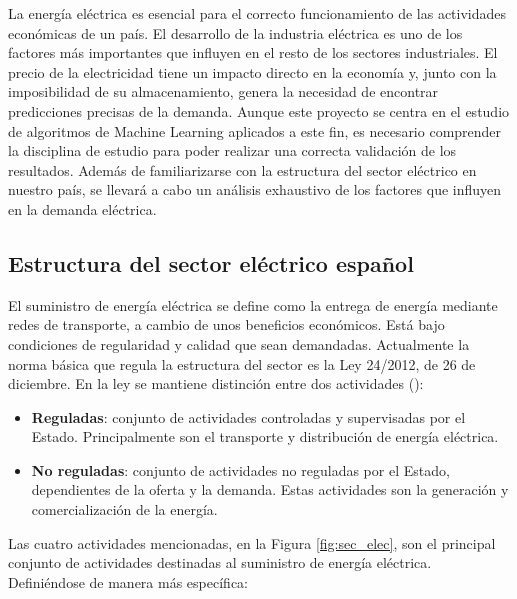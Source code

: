 \documentclass[12pt,a4paper]{report}
\begin{document}
La energía eléctrica es esencial para el correcto funcionamiento de las actividades económicas de un país. El desarrollo de la industria eléctrica es uno de los factores más importantes que influyen en el resto de los sectores industriales. El precio de la electricidad tiene un impacto directo en la economía y, junto con la imposibilidad de su almacenamiento, genera la necesidad de encontrar predicciones precisas de la demanda. Aunque este proyecto se centra en el estudio de algoritmos de Machine Learning aplicados a este fin, es necesario comprender la disciplina de estudio para poder realizar una correcta validación de los resultados. Además de familiarizarse con la estructura del sector eléctrico en nuestro país, se llevará a cabo un análisis exhaustivo de los factores que influyen en la demanda eléctrica.

\subsection{Estructura del sector eléctrico español}

El suministro de energía eléctrica se define como la entrega de energía mediante redes de transporte, a cambio de unos beneficios económicos. Está bajo condiciones de regularidad y calidad que sean demandadas. Actualmente la norma básica que regula la estructura del sector es la Ley 24/2012, de 26 de diciembre. En la ley se mantiene distinción entre dos actividades (\cite{miteco}):

\begin{itemize}
    \item \textbf{Reguladas}: conjunto de actividades controladas y supervisadas por el Estado. Principalmente son el transporte y distribución de energía eléctrica.
    \item \textbf{No reguladas}: conjunto de actividades no reguladas por el Estado, dependientes de la oferta y la demanda. Estas actividades son la generación y comercialización de la energía.
\end{itemize}

Las cuatro actividades mencionadas, en la Figura \ref{fig:sec_elec}, son el principal conjunto de actividades destinadas al suministro de energía eléctrica. Definiéndose de manera más específica:
\end{document}
